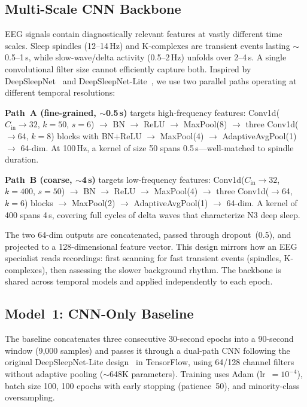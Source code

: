 \documentclass[final]{article}
\begin{document}
\subsection{Multi-Scale CNN Backbone}
\label{sec:cnn_backbone}

EEG signals contain diagnostically relevant features at vastly different time scales. Sleep spindles (12--14\,Hz) and K-complexes are transient events lasting $\sim$0.5--1\,s, while slow-wave/delta activity (0.5--2\,Hz) unfolds over 2--4\,s. A single convolutional filter size cannot efficiently capture both. Inspired by DeepSleepNet~\cite{Supratak2017} and DeepSleepNet-Lite~\cite{Fiorillo2019}, we use two parallel paths operating at different temporal resolutions:

\textbf{Path~A (fine-grained, $\sim$0.5\,s)} targets high-frequency features: Conv1d($C_{\text{in}} \!\to\! 32$, $k\!=\!50$, $s\!=\!6$) $\to$ BN $\to$ ReLU $\to$ MaxPool(8) $\to$ three Conv1d($\to$64, $k\!=\!8$) blocks with BN+ReLU $\to$ MaxPool(4) $\to$ AdaptiveAvgPool(1) $\to$ 64-dim. At 100\,Hz, a kernel of size 50 spans 0.5\,s---well-matched to spindle duration.

\textbf{Path~B (coarse, $\sim$4\,s)} targets low-frequency features: Conv1d($C_{\text{in}} \!\to\! 32$, $k\!=\!400$, $s\!=\!50$) $\to$ BN $\to$ ReLU $\to$ MaxPool(4) $\to$ three Conv1d($\to$64, $k\!=\!6$) blocks $\to$ MaxPool(2) $\to$ AdaptiveAvgPool(1) $\to$ 64-dim. A kernel of 400 spans 4\,s, covering full cycles of delta waves that characterize N3 deep sleep.

The two 64-dim outputs are concatenated, passed through dropout~(0.5), and projected to a 128-dimensional feature vector. This design mirrors how an EEG specialist reads recordings: first scanning for fast transient events (spindles, K-complexes), then assessing the slower background rhythm. The backbone is shared across temporal models and applied independently to each epoch.

\subsection{Model~1: CNN-Only Baseline}

The baseline concatenates three consecutive 30-second epochs into a 90-second window (9,000 samples) and passes it through a dual-path CNN following the original DeepSleepNet-Lite design~\cite{Fiorillo2019} in TensorFlow, using 64/128 channel filters without adaptive pooling ($\sim$648K parameters). Training uses Adam (lr~$= 10^{-4}$), batch size 100, 100 epochs with early stopping (patience~50), and minority-class oversampling.
\end{document}
